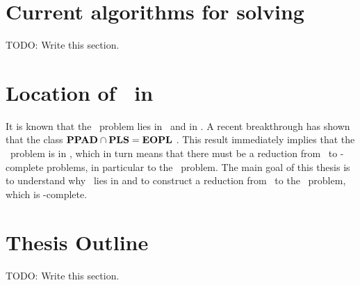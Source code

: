 \section{Current algorithms for solving \Tarski}

TODO: Write this section.

\section{Location of \Tarski\ in \TFNP}
It is known that the \Tarski\ problem lies in \PPAD\ and in \PLS. A recent breakthrough has shown that the class $\textbf{PPAD} \cap \textbf{PLS} = \textbf{EOPL}$ . This result immediately implies that the \Tarski\ problem is in \EOPL, which in turn means that there must be a reduction from \Tarski\ to \EOPL-complete problems, in particular to the \EndOfPotentialLine\ problem. The main goal of this thesis is to understand why \Tarski\ lies in \EOPL and to construct a reduction from \Tarski\ to the \EndOfPotentialLine\ problem, which is \EOPL-complete.

\section{Thesis Outline}

TODO: Write this section.
